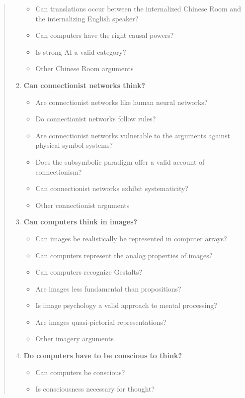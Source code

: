 \begin{quotation}
\begin{enumerate}
\begin{itemize}
        \item Can translations occur between the internalized Chinese Room and the internalizing English speaker?
        \item Can computers have the right causal powers?
        \item Is strong AI a valid category?
        \item Other Chinese Room arguments
      \end{itemize}
    \item \textbf{Can connectionist networks think?}
      \begin{itemize}
        \item Are connectionist networks like human neural networks?
        \item Do connectionist networks follow rules?
        \item Are connectionist networks vulnerable to the arguments against physical symbol systems?
        \item Does the subsymbolic paradigm offer a valid account of connectionism?
        \item Can connectionist networks exhibit systematicity?
        \item Other connectionist arguments
      \end{itemize}
    \item \textbf{Can computers think in images?}
      \begin{itemize}
        \item Can images be realistically be represented in computer arrays?
        \item Can computers represent the analog properties of images?
        \item Can computers recognize Gestalts?
        \item Are images less fundamental than propositions?
        \item Is image psychology a valid approach to mental processing?
        \item Are images quasi-pictorial representations?
        \item Other imagery arguments
      \end{itemize}
    \item \textbf{Do computers have to be conscious to think?}
      \begin{itemize}
        \item Can computers be conscious?
        \item Is consciousness necessary for thought?

\end{itemize}
\end{enumerate}
\end{quotation}
